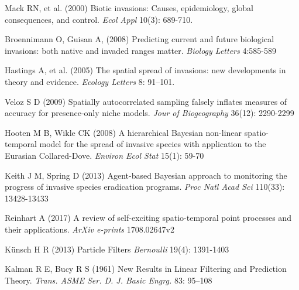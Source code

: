 \documentclass[11pt,a4paper]{article}
\begin{document}
\begin{thebibliography}{99}

 Mack RN, et al. (2000) Biotic invasions: Causes, epidemiology, global consequences, and control. \textit{Ecol Appl} 10(3): 689-710.


 Broennimann O, Guisan A, (2008) Predicting current and future biological invasions: both native and invaded ranges matter. \textit{Biology Letters} 4:585-589

 Hastings A, et al. (2005) The spatial spread of invasions: new developments in theory and evidence. \textit{Ecology Letters} 8: 91–101.

 Veloz S D (2009) Spatially autocorrelated sampling falsely inflates measures of accuracy for presence‐only niche models. \textit{Jour of Biogeography} 36(12): 2290-2299

 Hooten M B, Wikle CK (2008) A hierarchical Bayesian non-linear spatio-temporal model for the spread of invasive species with application to the Eurasian Collared-Dove. \textit{Environ Ecol Stat} 15(1): 59-70


 Keith J M, Spring D (2013) Agent-based Bayesian approach to monitoring the progress of invasive species eradication programs. \textit{Proc Natl Acad Sci} 110(33): 13428-13433


 Reinhart A (2017) A review of self-exciting spatio-temporal point processes and their applications. \textit{ArXiv e-prints} 1708.02647v2

 K\"{u}nsch H R (2013) Particle Filters \textit{Bernoulli} 19(4): 1391-1403

 Kalman R E, Bucy R S (1961) New Results in Linear Filtering and Prediction Theory. \textit{Trans. ASME Ser. D. J. Basic Engrg.} 83: 95–108


\end{thebibliography}
\end{document}
